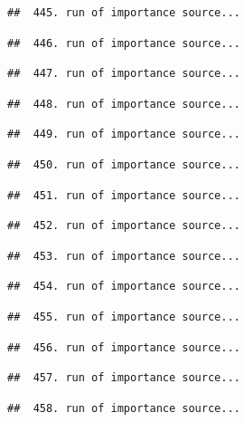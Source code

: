 \documentclass[
]{article}
\begin{document}
\begin{verbatim}
##  445. run of importance source...
\end{verbatim}

\begin{verbatim}
##  446. run of importance source...
\end{verbatim}

\begin{verbatim}
##  447. run of importance source...
\end{verbatim}

\begin{verbatim}
##  448. run of importance source...
\end{verbatim}

\begin{verbatim}
##  449. run of importance source...
\end{verbatim}

\begin{verbatim}
##  450. run of importance source...
\end{verbatim}

\begin{verbatim}
##  451. run of importance source...
\end{verbatim}

\begin{verbatim}
##  452. run of importance source...
\end{verbatim}

\begin{verbatim}
##  453. run of importance source...
\end{verbatim}

\begin{verbatim}
##  454. run of importance source...
\end{verbatim}

\begin{verbatim}
##  455. run of importance source...
\end{verbatim}

\begin{verbatim}
##  456. run of importance source...
\end{verbatim}

\begin{verbatim}
##  457. run of importance source...
\end{verbatim}

\begin{verbatim}
##  458. run of importance source...
\end{verbatim}
\end{document}
